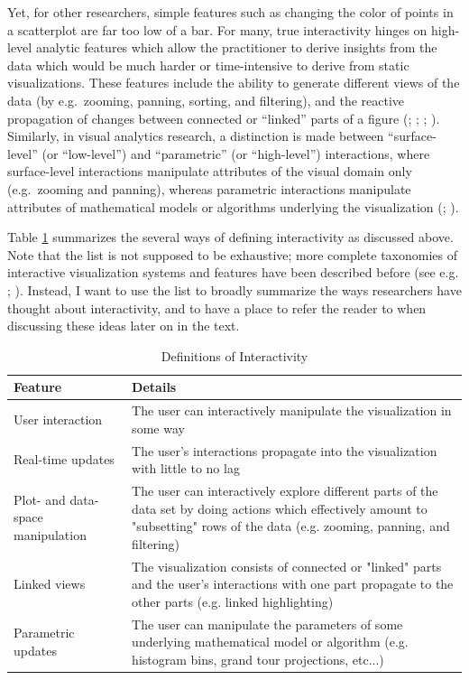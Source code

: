 \documentclass[
]{book}
\theoremstyle{definition}
\theoremstyle{definition}
\theoremstyle{definition}
\theoremstyle{definition}
\theoremstyle{remark}
\begin{document}
Yet, for other researchers, simple features such as changing the color of points in a scatterplot are far too low of a bar. For many, true interactivity hinges on high-level analytic features which allow the practitioner to derive insights from the data which would be much harder or time-intensive to derive from static visualizations. These features include the ability to generate different views of the data (by e.g.~zooming, panning, sorting, and filtering), and the reactive propagation of changes between connected or ``linked'' parts of a figure (; ; ; ). Similarly, in visual analytics research, a distinction is made between ``surface-level'' (or ``low-level'') and ``parametric'' (or ``high-level'') interactions, where surface-level interactions manipulate attributes of the visual domain only (e.g.~zooming and panning), whereas parametric interactions manipulate attributes of mathematical models or algorithms underlying the visualization (; ).

Table \ref{tab:definitions} summarizes the several ways of defining interactivity as discussed above. Note that the list is not supposed to be exhaustive; more complete taxonomies of interactive visualization systems and features have been described before (see e.g. ; ). Instead, I want to use the list to broadly summarize the ways researchers have thought about interactivity, and to have a place to refer the reader to when discussing these ideas later on in the text.

\begin{table}
\centering
\caption{\label{tab:definitions}Definitions of Interactivity}
\centering
\begin{tabular}[t]{l|l}
\hline
Feature & Details\\
\hline
User interaction & The user can interactively manipulate the visualization in some way\\
\hline
Real-time updates & The user's interactions propagate into the visualization with little to no lag\\
\hline
Plot- and data-space manipulation & The user can interactively explore different parts of the data set by doing actions which effectively amount to "subsetting" rows of the data (e.g. zooming, panning, and filtering)\\
\hline
Linked views & The visualization consists of connected or "linked" parts and the user's interactions with one part propagate to the other parts (e.g. linked highlighting)\\
\hline
Parametric updates & The user can manipulate the parameters of some underlying mathematical model or algorithm (e.g. histogram bins, grand tour projections, etc...)\\
\hline
\end{tabular}
\end{table}
\end{document}
